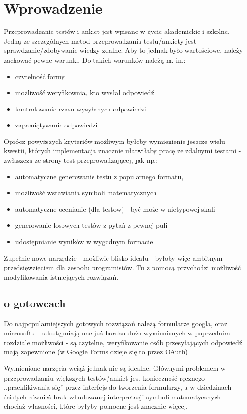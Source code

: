 \documentclass[lic,shortabstract]{iithesis}
\author         {Agnieszka Pawicka}
\date          {Wrocław 2021} %
\begin{document}

\section{Wprowadzenie}%
Przeprowadzanie testów i ankiet jest wpisane w życie akademickie i szkolne. Jedną ze szczególnych metod przeprowadzania testu/ankiety jest sprawdzanie/zdobywanie wiedzy zdalne.
Aby to jednak było wartościowe, należy zachować pewne warunki. Do takich warunków należą m. in.:
\begin{itemize}
\item czytelność formy
\item możliwość weryfikownia, kto wysłał odpowiedź
\item kontrolowanie czasu wysyłanych odpowiedzi
\item zapamiętywanie odpowiedzi
\end{itemize}
Oprócz powyższych kryteriów możliwym byłoby wymienienie jeszcze wielu kwestii, których implementacja znacznie ułatwiłaby pracę ze zdalnymi testami - zwłaszcza ze strony test przeprowadzającej, jak np.:
\begin{itemize}
\item automatyczne generowanie testu z popularnego formatu,
\item możliwość wstawiania symboli matematycznych
\item automatyczne ocenianie (dla testow)  - być może w nietypowej skali
\item generowanie losowych testów z pytań z pewnej puli
\item udostępnianie wyników w wygodnym formacie
\end{itemize}
Zupełnie nowe narzędzie - możliwie blisko ideału - byłoby więc ambitnym przedsięwzięciem dla zespołu programistów. Tu z pomocą przychodzi możliwość modyfikowania istniejących rozwiązań.

\subsection{o gotowcach}
Do najpopularniejszych gotowych rozwiązań należą formularze googla, oraz microsoftu - udostępniają one już bardzo dużo wymienionych w poprzednim rozdziale możliwości - są czytelne, weryfikowanie osób przesyłających odpowiedź mają zapewnione (w Google Forms dzieje się  to przez OAuth)


 Wymienione narzęcia wciąż jednak nie są idealne. Głównymi problemem w przeprowadzaniu większych testów/ankiet jest konieczność ręcznego ,,przeklikiwania się'' przez interfejs do tworzenia formularzy, a w dziedzinach ścisłych również brak wbudowanej interpretacji symboli matematycznych - chociaż własności, które byłyby pomocne jest znacznie więcej. 
\end{document}
